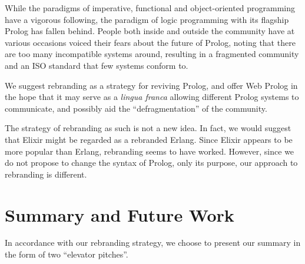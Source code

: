 \documentclass{tlp}
\begin{document}
\vspace{2mm}

\noindent While the paradigms of imperative, functional and object-oriented programming have a vigorous following, the paradigm of logic programming with its flagship Prolog has fallen behind. People both inside and outside the community have at various occasions voiced their fears about the future of Prolog, noting that there are too many incompatible systems around, resulting in a fragmented community and an ISO standard that few systems conform to.

We suggest rebranding as a strategy for reviving Prolog, and offer Web Prolog in the hope that it may serve as a \textit{lingua franca} allowing different Prolog systems to communicate, and possibly aid the ``defragmentation'' of the community.

The strategy of rebranding as such is not a new idea. In fact, we would suggest that Elixir might be regarded as a rebranded Erlang. Since Elixir appears to be more popular than Erlang, rebranding seems to have worked. However, since we do not propose to change the syntax of Prolog, only its purpose, our approach to rebranding is different.




\section{Summary and Future Work}\label{sec:summary}

In accordance with our rebranding strategy, we choose to present our summary in the form of two ``elevator pitches''.

\vspace{0.3cm}
\end{document}
